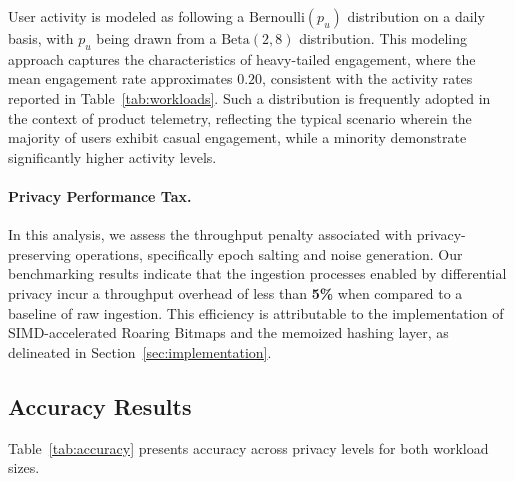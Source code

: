 \documentclass[sigconf,anonymous,review]{acmart}
\begin{document}
User activity is modeled as following a \(\text{Bernoulli}(p_u)\) distribution on a daily basis, with \(p_u\) being drawn from a \(\text{Beta}(2, 8)\) distribution. This modeling approach captures the characteristics of heavy-tailed engagement, where the mean engagement rate approximates \(0.20\), consistent with the activity rates reported in Table~\ref{tab:workloads}. Such a distribution is frequently adopted in the context of product telemetry, reflecting the typical scenario wherein the majority of users exhibit casual engagement, while a minority demonstrate significantly higher activity levels.

\paragraph{Privacy Performance Tax.} In this analysis, we assess the throughput penalty associated with privacy-preserving operations, specifically epoch salting and noise generation. Our benchmarking results indicate that the ingestion processes enabled by differential privacy incur a throughput overhead of less than \textbf{5\%} when compared to a baseline of raw ingestion. This efficiency is attributable to the implementation of SIMD-accelerated Roaring Bitmaps and the memoized hashing layer, as delineated in Section~\ref{sec:implementation}.

\subsection{Accuracy Results}
\label{sec:accuracy-results}

Table~\ref{tab:accuracy} presents accuracy across privacy levels for both workload sizes.
\end{document}
